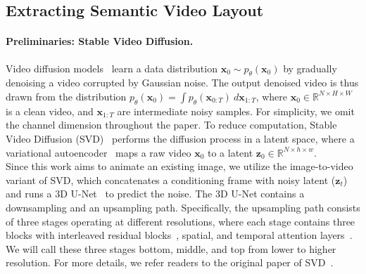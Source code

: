 \documentclass{article} \usepackage{iclr2025_conference,times}
\begin{document}
 
\subsection{Extracting Semantic Video Layout}
\label{sec:motion_estimation}
\paragraph{Preliminaries: Stable Video Diffusion.}
Video diffusion models~\citep{VideoDiffusionModels} learn a data distribution $\bm{x}_0 \sim p_\theta(\bm{x}_0)$ by gradually denoising a video corrupted by Gaussian noise. 
The output denoised video is thus drawn from the distribution $p_\theta(\bm{x}_0) = \int p_\theta(\bm{x}_{0:T}) \ d\bm{x}_{1:T}$, where $\bm{x}_0 \in \mathbb{R}^{N \times H \times W}$ is a clean video, and $\bm{x}_{1:T}$ are intermediate noisy samples.
For simplicity, we omit the channel dimension throughout the paper.
To reduce computation, Stable Video Diffusion (SVD)~\citep{blattmann2023stable} performs the diffusion process in a latent space, where a variational autoencoder~\citep{VAE} maps a raw video $\bm{x}_0$ to a latent $\bm{z}_0 \in \mathbb{R}^{N \times h \times w}$. \\
Since this work aims to animate an existing image, we utilize the image-to-video variant of SVD, which concatenates a conditioning frame with noisy latent ($\bm{z}_t$) and runs a 3D U-Net~\citep{U-net} to predict the noise.
The 3D U-Net contains a downsampling and an upsampling path.
Specifically, the upsampling path consists of three stages operating at different resolutions, where each stage contains three blocks with interleaved residual blocks~\citep{ResNet}, spatial, and temporal attention layers~\citep{Transformer}.
We will call these three stages bottom, middle, and top from lower to higher resolution.
For more details, we refer readers to the original paper of SVD~\citep{blattmann2023stable}.


\vspace{-2.0mm}
\end{document}
